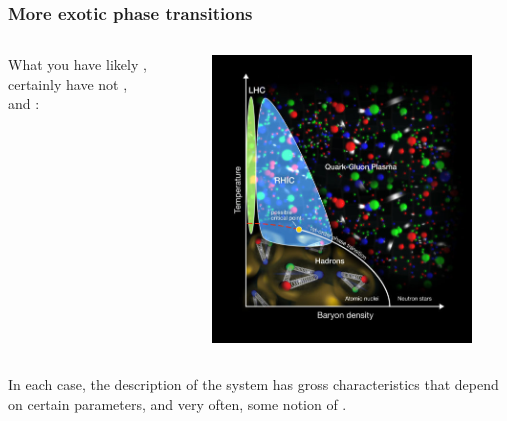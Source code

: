 \documentclass[hyperref={colorlinks=true}]{beamer}
\begin{document}
\begin{frame}%
  \frametitle{More exotic phase transitions}

  \begin{columns}
  
 
  What you have likely , certainly have not , and  :
  
  \vspace{0.5cm}
  
  
  \begin{figure}
    \includegraphics[width=\columnwidth]{LHCPhaseTransition.jpg}
  \end{figure}
  \end{columns}

  \vspace{0.3cm}

  In each case, the description of the system has gross characteristics that depend on certain parameters, and very often, some notion of .
  
\end{frame}
\end{document}
